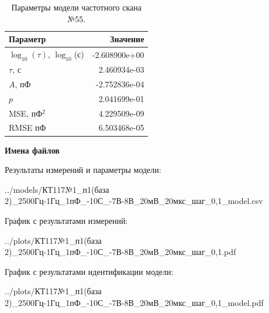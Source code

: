 \begin{table}[!ht]
    \centering
    \caption{Параметры модели частотного скана №55.}
    \begin{tabular}{|l|r|}
        \hline
        Параметр                                       & Значение                  \\ \hline
        $\log_{10}(\tau)$, $\log_{10}$(с)              & -2.608900e+00             \\ \hline
        $\tau$, с                                      & 2.460934e-03              \\ \hline
        $A$, пФ                                        & -2.752836e-04             \\ \hline
        $p$                                            & 2.041699e-01              \\ \hline
        MSE, пФ$^2$                                    & 4.229509e-09              \\ \hline
        RMSE пФ                                        & 6.503468e-05              \\ \hline
    \end{tabular}
    \label{table:frequency_scan_model_55}
\end{table}

\textbf{Имена файлов}

Результаты измерений и параметры модели:

\scriptsize../models/КТ117№1\_п1(база 2)\_2500Гц-1Гц\_1пФ\_-10С\_-7В-8В\_20мВ\_20мкс\_шаг\_0,1\_model.csv
\normalsize

График с результатами измерений:

\scriptsize../plots/КТ117№1\_п1(база 2)\_2500Гц-1Гц\_1пФ\_-10С\_-7В-8В\_20мВ\_20мкс\_шаг\_0,1.pdf
\normalsize

График с результатами идентификации модели:

\scriptsize../plots/КТ117№1\_п1(база 2)\_2500Гц-1Гц\_1пФ\_-10С\_-7В-8В\_20мВ\_20мкс\_шаг\_0,1\_model.pdf
\normalsize

